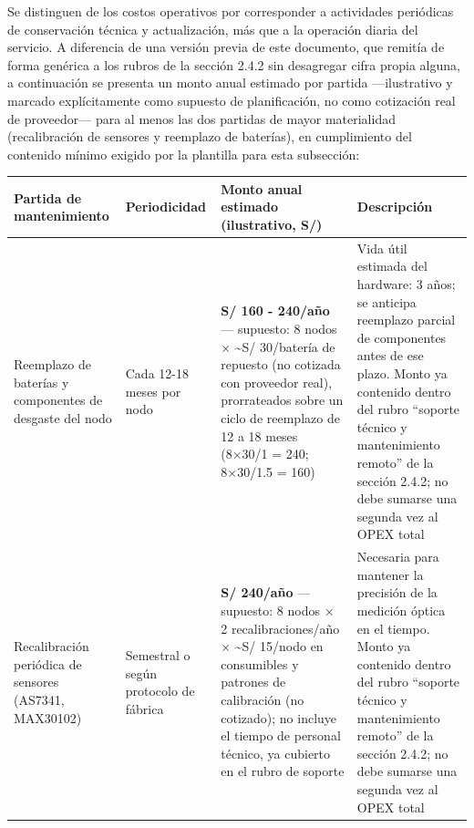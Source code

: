 \documentclass[11pt,a4paper]{article}
\begin{document}
Se distinguen de los costos operativos por corresponder a actividades periódicas de conservación técnica y actualización, más que a la operación diaria del servicio. A diferencia de una versión previa de este documento, que remitía de forma genérica a los rubros de la sección 2.4.2 sin desagregar cifra propia alguna, a continuación se presenta un monto anual estimado por partida ---ilustrativo y marcado explícitamente como supuesto de planificación, no como cotización real de proveedor--- para al menos las dos partidas de mayor materialidad (recalibración de sensores y reemplazo de baterías), en cumplimiento del contenido mínimo exigido por la plantilla para esta subsección:

{\small
\begin{longtable}[]{@{}
  >{\raggedright\arraybackslash}p{}
  >{\raggedright\arraybackslash}p{}
  >{\raggedright\arraybackslash}p{}
  >{\raggedright\arraybackslash}p{}@{}}
\toprule\noalign{}
\begin{minipage}[b]{\linewidth}\raggedright
Partida de mantenimiento
\end{minipage} & \begin{minipage}[b]{\linewidth}\raggedright
Periodicidad
\end{minipage} & \begin{minipage}[b]{\linewidth}\raggedright
Monto anual estimado (ilustrativo, S/)
\end{minipage} & \begin{minipage}[b]{\linewidth}\raggedright
Descripción
\end{minipage} \\
\midrule\noalign{}
\endhead
\bottomrule\noalign{}
\endlastfoot
Reemplazo de baterías y componentes de desgaste del nodo & Cada 12-18 meses por nodo & \textbf{S/ 160 - 240/año} --- supuesto: 8 nodos × \textasciitilde S/ 30/batería de repuesto (no cotizada con proveedor real), prorrateados sobre un ciclo de reemplazo de 12 a 18 meses (8×30/1 = 240; 8×30/1.5 = 160) & Vida útil estimada del hardware: 3 años; se anticipa reemplazo parcial de componentes antes de ese plazo. Monto ya contenido dentro del rubro ``soporte técnico y mantenimiento remoto'' de la sección 2.4.2; no debe sumarse una segunda vez al OPEX total \\
Recalibración periódica de sensores (AS7341, MAX30102) & Semestral o según protocolo de fábrica & \textbf{S/ 240/año} --- supuesto: 8 nodos × 2 recalibraciones/año × \textasciitilde S/ 15/nodo en consumibles y patrones de calibración (no cotizado); no incluye el tiempo de personal técnico, ya cubierto en el rubro de soporte & Necesaria para mantener la precisión de la medición óptica en el tiempo. Monto ya contenido dentro del rubro ``soporte técnico y mantenimiento remoto'' de la sección 2.4.2; no debe sumarse una segunda vez al OPEX total \\

\end{longtable}}
\end{document}
